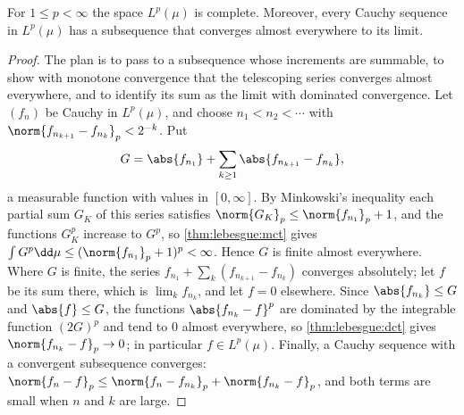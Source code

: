 \begin{refsection}
\begin{theorem}\label{thm:lebesgue:rieszfischer}
For $1\le p<\infty$ the space $L^p(\mu)$ is complete. Moreover, every Cauchy sequence in $L^p(\mu)$ has a subsequence that converges almost everywhere to its limit.
\end{theorem}

\begin{proof}
The plan is to pass to a subsequence whose increments are summable, to show with monotone convergence that the telescoping series converges almost everywhere, and to identify its sum as the limit with dominated convergence. Let $(f_n)$ be Cauchy in $L^p(\mu)$, and choose $n_1<n_2<\cdots$ with $\norm{f_{n_{k+1}}-f_{n_k}}_p<2^{-k}$. Put
\[
  G=\abs{f_{n_1}}+\sum_{k\ge1}\abs{f_{n_{k+1}}-f_{n_k}},
\]
a measurable function with values in $[0,\infty]$. By Minkowski's inequality each partial sum $G_K$ of this series satisfies $\norm{G_K}_p\le\norm{f_{n_1}}_p+1$, and the functions $G_K^p$ increase to $G^p$, so \cref{thm:lebesgue:mct} gives $\int G^p\dd\mu\le(\norm{f_{n_1}}_p+1)^p<\infty$. Hence $G$ is finite almost everywhere. Where $G$ is finite, the series $f_{n_1}+\sum_k(f_{n_{k+1}}-f_{n_k})$ converges absolutely; let $f$ be its sum there, which is $\lim_kf_{n_k}$, and let $f=0$ elsewhere. Since $\abs{f_{n_k}}\le G$ and $\abs{f}\le G$, the functions $\abs{f_{n_k}-f}^p$ are dominated by the integrable function $(2G)^p$ and tend to $0$ almost everywhere, so \cref{thm:lebesgue:dct} gives $\norm{f_{n_k}-f}_p\to0$; in particular $f\in L^p(\mu)$. Finally, a Cauchy sequence with a convergent subsequence converges: $\norm{f_n-f}_p\le\norm{f_n-f_{n_k}}_p+\norm{f_{n_k}-f}_p$, and both terms are small when $n$ and $k$ are large.
\end{proof}



\end{refsection}

